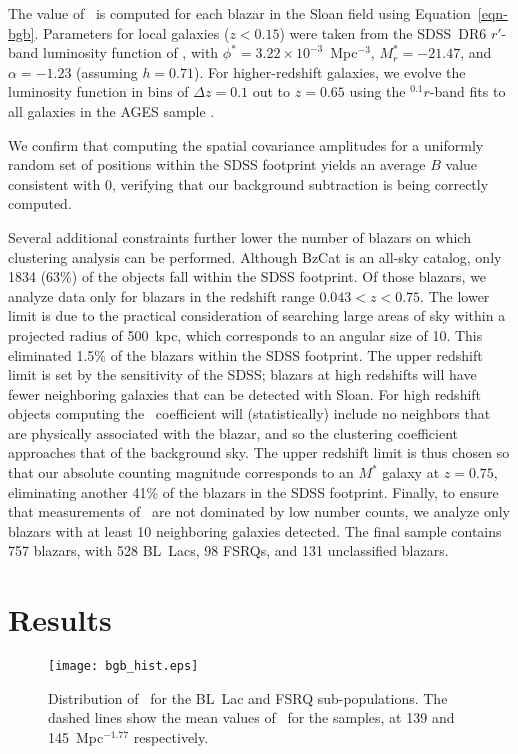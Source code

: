\documentclass{emulateapj}
\begin{document}
The value of \bgb~is computed for each blazar in the Sloan field using Equation~\ref{eqn-bgb}. Parameters for local galaxies ($z<0.15$) were taken from the SDSS~DR6 $r'$-band luminosity function of \citet{mon09a}, with $\phi^*=3.22\times10^{-3}$~Mpc$^{-3}$, $M_r^*=-21.47$, and $\alpha=-1.23$ (assuming $h=0.71$). For higher-redshift galaxies, we evolve the luminosity function in bins of $\Delta z=0.1$ out to $z=0.65$ using the $^{0.1}r$-band fits to all galaxies in the AGES sample \citep{coo12}. 

We confirm that computing the spatial covariance amplitudes for a uniformly random set of positions within the SDSS footprint yields an average $B$ value consistent with 0, verifying that our background subtraction is being correctly computed. 

Several additional constraints further lower the number of blazars on which clustering analysis can be performed. Although BzCat is an all-sky catalog, only 1834 (63\%) of the objects fall within the SDSS footprint. Of those blazars, we analyze data only for blazars in the redshift range $0.043<z<0.75$. The lower limit is due to the practical consideration of searching large areas of sky within a projected radius of 500~kpc, which corresponds to an angular size of 10\arcmin. This eliminated 1.5\% of the blazars within the SDSS footprint. The upper redshift limit is set by the sensitivity of the SDSS; blazars at high redshifts will have fewer neighboring galaxies that can be detected with Sloan. For high redshift objects computing the \bgb~coefficient will (statistically) include no neighbors that are physically associated with the blazar, and so the clustering coefficient approaches that of the background sky. The upper redshift limit is thus chosen so that our absolute counting magnitude corresponds to an $M^*$ galaxy at $z=0.75$, eliminating another 41\% of the blazars in the SDSS footprint. Finally, to ensure that measurements of \bgb~are not dominated by low number counts, we analyze only blazars with at least 10 neighboring galaxies detected. The final sample contains 757 blazars, with 528 BL~Lacs, 98 FSRQs, and 131 unclassified blazars. 


\section{Results}\label{sec-survey_results}

\begin{figure}
\texttt{[image: bgb\_hist.eps]}
\caption{Distribution of \bgb~for the BL~Lac and FSRQ sub-populations. The dashed lines show the mean values of \bgb~for the samples, at 139 and 145~Mpc$^{-1.77}$ respectively. 
\label{fig-bgb_hist}}
\end{figure}
\end{document}
